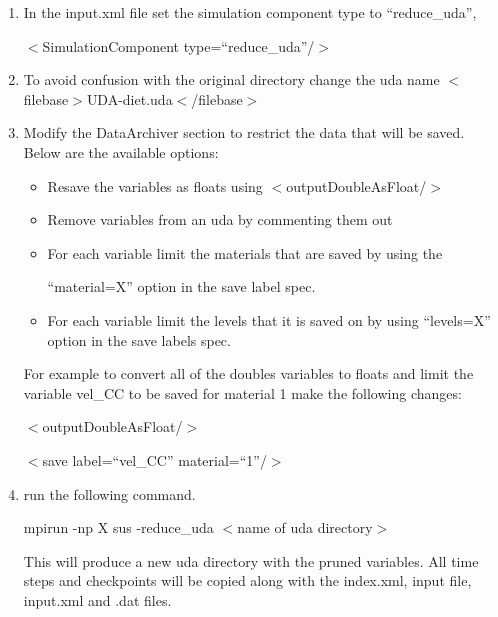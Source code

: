 \begin{enumerate}
\item In the input.xml file set the simulation component type to ``reduce\_uda'', 

$<$SimulationComponent type=``reduce\_uda''/$>$
\item To avoid confusion with the original directory  change the uda name
   $<$filebase$>$UDA-diet.uda$<$/filebase$>$

\item Modify the DataArchiver section to restrict the data that will be saved.  Below are the available options:
   \begin{itemize}
     \item Resave the variables as floats using $<$outputDoubleAsFloat/$>$
     \item Remove variables from an uda by commenting them out
     \item For each variable limit the materials that are saved by using the 
    
     ``material=X'' option in the save label spec.
     \item For each variable limit the levels that it is saved on by using ``levels=X'' option in the save labels spec.
  \end{itemize}
For example to convert all of the doubles variables to floats and limit the variable vel\_CC to be
saved for material 1 make the following changes:

$<$outputDoubleAsFloat/$>$

$<$save label=``vel\_CC'' material=``1''/$>$


\item run the following command.

    mpirun -np X sus -reduce\_uda $<$name of uda directory$>$
    
    This will produce a new uda directory with the pruned variables. All time steps and checkpoints will be copied along with the index.xml, input file, input.xml and .dat files.

\end{enumerate}

